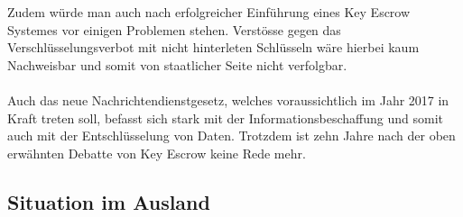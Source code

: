 Zudem würde man auch nach erfolgreicher Einführung eines Key Escrow Systemes vor einigen Problemen stehen. Verstösse gegen das Verschlüsselungsverbot mit nicht hinterleten Schlüsseln wäre hierbei kaum Nachweisbar und somit von staatlicher Seite nicht verfolgbar. \cite[S. 5735]{adminch} \\
\\
Auch das neue Nachrichtendienstgesetz, welches voraussichtlich im Jahr 2017 in Kraft treten soll, befasst sich stark mit der Informationsbeschaffung und somit auch mit der Entschlüsselung von Daten. Trotzdem ist  zehn Jahre nach der oben erwähnten Debatte von Key Escrow keine Rede mehr. \cite{botschaftndg} \cite{ndgesetz}  \\
		
	\subsection{Situation im Ausland}
		
